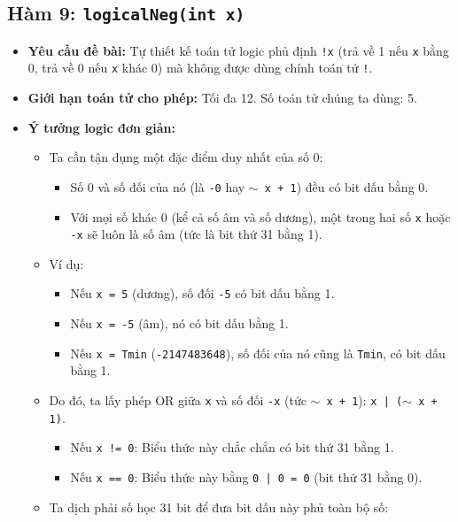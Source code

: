 \documentclass[12pt, a4paper]{article}
\begin{document}
\subsection{Hàm 9: \texttt{logicalNeg(int x)}}
\begin{itemize}
    \item \textbf{Yêu cầu đề bài:} Tự thiết kế toán tử logic phủ định \texttt{!x} (trả về 1 nếu \texttt{x} bằng 0, trả về 0 nếu \texttt{x} khác 0) mà không được dùng chính toán tử \texttt{!}.
    \item \textbf{Giới hạn toán tử cho phép:} Tối đa 12. Số toán tử chúng ta dùng: 5.
    \item \textbf{Ý tưởng logic đơn giản:}
    \begin{itemize}
        \item Ta cần tận dụng một đặc điểm duy nhất của số 0:
        \begin{itemize}
            \item Số 0 và số đối của nó (là \texttt{-0} hay \texttt{\(\sim\) x + 1}) đều có bit dấu bằng 0.
            \item Với mọi số khác 0 (kể cả số âm và số dương), một trong hai số \texttt{x} hoặc \texttt{-x} sẽ luôn là số âm (tức là bit thứ 31 bằng 1).
        \end{itemize}
        \item Ví dụ:
        \begin{itemize}
            \item Nếu \texttt{x = 5} (dương), số đối \texttt{-5} có bit dấu bằng 1.
            \item Nếu \texttt{x = -5} (âm), nó có bit dấu bằng 1.
            \item Nếu \texttt{x = Tmin} (\texttt{-2147483648}), số đối của nó cũng là \texttt{Tmin}, có bit dấu bằng 1.
        \end{itemize}
        \item Do đó, ta lấy phép OR giữa \texttt{x} và số đối \texttt{-x} (tức \texttt{\(\sim\) x + 1}): \texttt{x | (\(\sim\) x + 1)}.
        \begin{itemize}
            \item Nếu \texttt{x != 0}: Biểu thức này chắc chắn có bit thứ 31 bằng 1.
            \item Nếu \texttt{x == 0}: Biểu thức này bằng \texttt{0 | 0 = 0} (bit thứ 31 bằng 0).
        \end{itemize}
        \item Ta dịch phải số học 31 bit để đưa bit dấu này phủ toàn bộ số:
        \begin{itemize}

\end{itemize}
\end{itemize}
\end{itemize}
\end{document}
